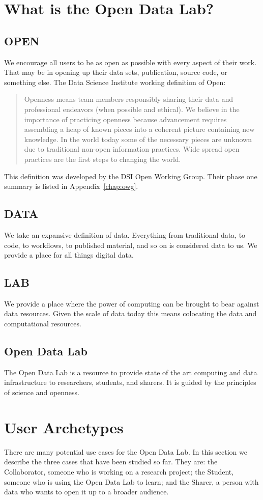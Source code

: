 \section{What is the Open Data Lab?}
\subsection*{OPEN}
We encourage all users to be as open as possible with every aspect of their work. That may be in opening up their data sets, publication, source code, or something else.
The Data Science Institute working definition of Open:
\begin{quote}
Openness means team members responsibly sharing their data and professional endeavors (when possible and ethical). We believe in the importance of practicing openness because advancement requires assembling a heap of known pieces into a coherent picture containing new knowledge. In the world today some of the necessary pieces are unknown due to traditional non-open information practices. Wide spread open practices are the first steps to changing the world.
\end{quote}

This definition was developed by the DSI Open Working Group. Their phase one summary is listed in Appendix~\ref{chap:owg}.

\subsection*{DATA}
We take an expansive definition of data. Everything from traditional data, to code, to workflows, to published material, and so on is considered data to us. We provide a place for all things digital data.
\subsection*{LAB}
We provide a place where the power of computing can be brought to bear against data resources. Given the scale of data today this means colocating the data and computational resources.
\subsection*{Open Data Lab}
The Open Data Lab is a resource to provide state of the art computing and data infrastructure to researchers, students, and sharers. It is guided by the principles of science and openness.
 
\section{User Archetypes}
\label{sec:archetypes}
There are many potential use cases for the Open Data Lab. In this section we describe the three cases that have been studied so far. They are: the Collaborator, someone who is working on a research project; the Student, someone who is using the Open Data Lab to learn; and the Sharer, a person with data who wants to open it up to a broader audience.

